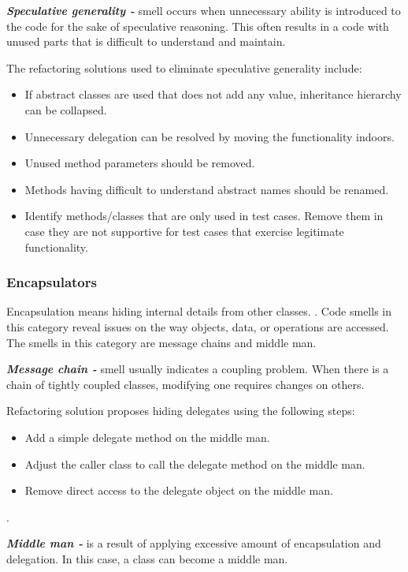 \textit{\textbf{Speculative generality -}} smell occurs when unnecessary ability is introduced to the code for the sake of speculative reasoning. This often results in a code with unused parts that is difficult to understand and maintain. 

The refactoring solutions used to eliminate speculative generality include:

\begin{itemize}
\item If abstract classes are used that does not add any value, inheritance hierarchy can be collapsed.
\item Unnecessary delegation can be resolved by moving the functionality indoors.
\item Unused method parameters should be removed.
\item Methods having difficult to understand abstract names should be renamed.
\item Identify methods/classes that are only used in test cases. Remove them in case they are not supportive for test cases that exercise legitimate functionality. 
\end{itemize}

\subsubsection*{Encapsulators}
Encapsulation means hiding internal details from other classes. \cite{fowlerRefactor}. Code smells in this category reveal issues on the way objects, data, or operations are accessed. The smells in this category are message chains and middle man. 

\textit{\textbf{Message chain -}} smell usually indicates a coupling problem. When there is a chain of tightly coupled classes, modifying one requires changes on others.

Refactoring solution proposes hiding delegates using the following steps:

\begin{itemize}
\item Add a simple delegate method on the middle man. 
\item Adjust the caller class to call the delegate method on the middle man.
\item Remove direct access to the delegate object on the middle man.
\end{itemize}. 
 
\textit{\textbf{Middle man -}} is a result of applying excessive amount of encapsulation and delegation. In this case, a class can become a middle man.

